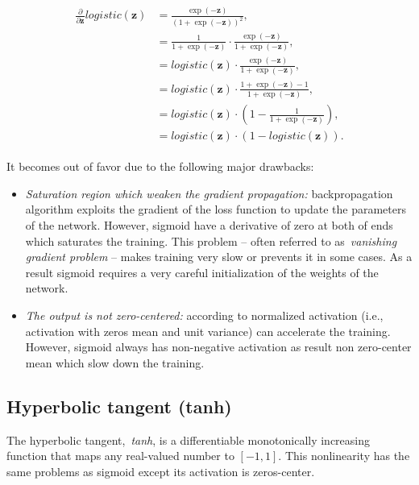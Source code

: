 \begin{align}\label{eq:logistic_derivative}
\begin{split}%
    \frac{\partial}{\partial \mathbf{z}}logistic(\mathbf{z}) &=
        \frac{\exp(\mathbf{-z})}{\left(1+\exp(-\mathbf{z})\right)^2} ,\\
    &= \frac{1}{1+\exp(-\mathbf{z})} \cdot
        \frac{\exp(-\mathbf{z})}{1+\exp(-\mathbf{z})} ,\\
    &= logistic(\mathbf{z}) \cdot
        \frac{\exp(-\mathbf{z})}{1+\exp(-\mathbf{z})} ,\\
    &= logistic(\mathbf{z}) \cdot
        \frac{1+\exp(-\mathbf{z})-1}{1+\exp(-\mathbf{z})} ,\\
    &= logistic(\mathbf{z}) \cdot
        \left(1-\frac{1}{1+\exp(-\mathbf{z})}\right) ,\\
    &= logistic(\mathbf{z}) \cdot (1-logistic(\mathbf{z})).
\end{split}
\end{align}

It becomes out of favor due to the following major drawbacks:
\begin{itemize}
    \item \emph{Saturation region which weaken the gradient propagation:}
        backpropagation algorithm exploits the gradient of the loss function to update the parameters of the network. 
        However, sigmoid have a derivative of zero at both of ends which saturates the training. This problem -- often referred to as~\emph{vanishing gradient problem} -- makes training very slow or prevents it in some cases. As a result sigmoid requires a very careful initialization of the weights of the network.
    \item \emph{The output is not zero-centered:} 
    according to \cite{ioffe2015batch} normalized activation (i.e., activation with zeros mean and unit variance) can accelerate the training. However, sigmoid always has non-negative activation as result non zero-center mean which slow down the training.
\end{itemize}

\subsection{Hyperbolic tangent (tanh)}\label{sec:tanh}

The hyperbolic tangent,~\emph{tanh}, is a differentiable monotonically increasing function that maps any real-valued number to $[-1, 1]$. This nonlinearity has the same problems as sigmoid except its activation is zeros-center.

